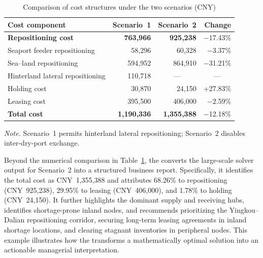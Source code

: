 \documentclass[preprint,12pt]{elsarticle}
\begin{document}
\begin{table}[htbp]
\centering
\begin{threeparttable}
\caption{Comparison of cost structures under the two scenarios (CNY)}
\label{tab:cost_summary}
\small
\setlength{\tabcolsep}{7pt}
\renewcommand{\arraystretch}{1.20}
\begin{tabular}{@{}l r r r@{}}
\toprule
\textbf{Cost component} & \textbf{Scenario~1} & \textbf{Scenario~2} & \textbf{Change} \\
\midrule
\textbf{Repositioning cost} & \textbf{763,966} & \textbf{925,238} & $-$17.43\% \\
\quad Seaport feeder repositioning & 58,296 & 60,328 & $-$3.37\% \\
\quad Sea--land repositioning & 594,952 & 864,910 & $-$31.21\% \\
\quad Hinterland lateral repositioning & 110,718 & \multicolumn{1}{c}{---} & \multicolumn{1}{c}{---} \\
\addlinespace
Holding cost & 30,870 & 24,150 & +27.83\% \\
\addlinespace
Leasing cost & 395,500 & 406,000 & $-$2.59\% \\
\midrule
\textbf{Total cost} & \textbf{1,190,336} & \textbf{1,355,388} & $-$12.18\% \\
\bottomrule
\end{tabular}
\begin{tablenotes}[flushleft]
 \footnotesize
 \item \textit{Note.} Scenario~1 permits hinterland lateral repositioning; Scenario~2 disables inter-dry-port exchange.
\end{tablenotes}
\end{threeparttable}
\end{table}

Beyond the numerical comparison in Table~\ref{tab:cost_summary}, the  converts the large-scale solver output for Scenario~2 into a structured business report. Specifically, it identifies the total cost as CNY~1,355,388 and attributes 68.26\% to repositioning (CNY~925,238), 29.95\% to leasing (CNY~406,000), and 1.78\% to holding (CNY~24,150). It further highlights the dominant supply and receiving hubs, identifies shortage-prone inland nodes, and recommends prioritizing the Yingkou--Dalian repositioning corridor, securing long-term leasing agreements in inland shortage locations, and clearing stagnant inventories in peripheral nodes. This example illustrates how the  transforms a mathematically optimal solution into an actionable managerial interpretation.
\end{document}
